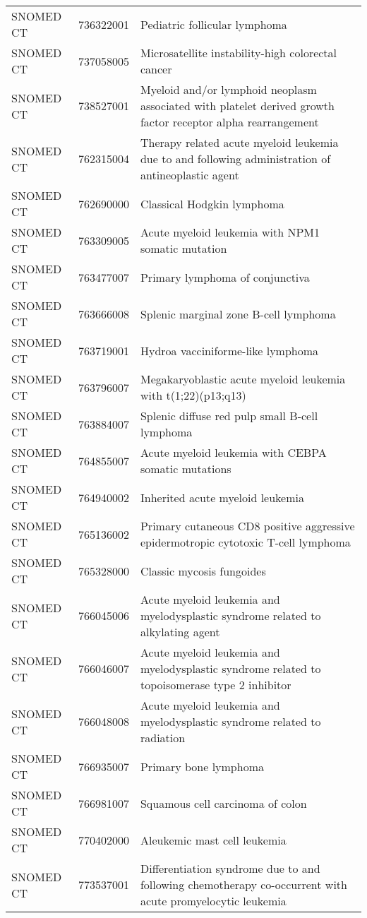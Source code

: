 \begin{longtable}{p{}p{}p{}}
  SNOMED CT & 736322001 & Pediatric follicular lymphoma \\ 
  SNOMED CT & 737058005 & Microsatellite instability-high colorectal cancer \\ 
  SNOMED CT & 738527001 & Myeloid and/or lymphoid neoplasm associated with platelet derived growth factor receptor alpha rearrangement \\ 
  SNOMED CT & 762315004 & Therapy related acute myeloid leukemia due to and following administration of antineoplastic agent \\ 
  SNOMED CT & 762690000 & Classical Hodgkin lymphoma \\ 
  SNOMED CT & 763309005 & Acute myeloid leukemia with NPM1 somatic mutation \\ 
  SNOMED CT & 763477007 & Primary lymphoma of conjunctiva \\ 
  SNOMED CT & 763666008 & Splenic marginal zone B-cell lymphoma \\ 
  SNOMED CT & 763719001 & Hydroa vacciniforme-like lymphoma \\ 
  SNOMED CT & 763796007 & Megakaryoblastic acute myeloid leukemia with t(1;22)(p13;q13) \\ 
  SNOMED CT & 763884007 & Splenic diffuse red pulp small B-cell lymphoma \\ 
  SNOMED CT & 764855007 & Acute myeloid leukemia with CEBPA somatic mutations \\ 
  SNOMED CT & 764940002 & Inherited acute myeloid leukemia \\ 
  SNOMED CT & 765136002 & Primary cutaneous CD8 positive aggressive epidermotropic cytotoxic T-cell lymphoma \\ 
  SNOMED CT & 765328000 & Classic mycosis fungoides \\ 
  SNOMED CT & 766045006 & Acute myeloid leukemia and myelodysplastic syndrome related to alkylating agent \\ 
  SNOMED CT & 766046007 & Acute myeloid leukemia and myelodysplastic syndrome related to topoisomerase type 2 inhibitor \\ 
  SNOMED CT & 766048008 & Acute myeloid leukemia and myelodysplastic syndrome related to radiation \\ 
  SNOMED CT & 766935007 & Primary bone lymphoma \\ 
  SNOMED CT & 766981007 & Squamous cell carcinoma of colon \\ 
  SNOMED CT & 770402000 & Aleukemic mast cell leukemia \\ 
  SNOMED CT & 773537001 & Differentiation syndrome due to and following chemotherapy co-occurrent with acute promyelocytic leukemia \\ 

\end{longtable}
